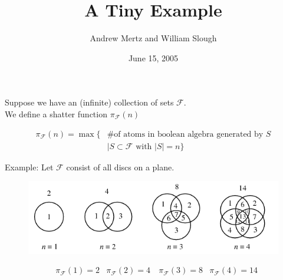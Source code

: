 \documentclass{beamer}
\title{A Tiny Example}
\author{Andrew Mertz and William Slough}
\date{June 15, 2005}
\newcommand{\F}{\mathcal F}
\begin{document}
\maketitle

\begin{frame}
	Suppose we have an (infinite) collection of sets $\F$. \\
	We define a shatter function $\pi_\F(n)$

	\begin{align*}
		\pi_\F(n) = \max \{ &\text {\# of atoms in boolean algebra generated by $S$} \\
		            &\mid S \subset \F \text{ with } |S| = n\}
	\end{align*}
\end{frame}

\begin{frame}
	Example: Let $\F$ consist of all discs on a plane.
	\begin{figure}[p]
    \centering
    \includegraphics[scale=0.75]{circle.png}
	\end{figure}
	\begin{align*}
		&\pi_\F(1) = 2 &\pi_\F(2) = 4\ &\pi_\F(3) = 8 &\pi_\F(4) = 14 \\
	\end{align*}
\end{frame}
\end{document}

